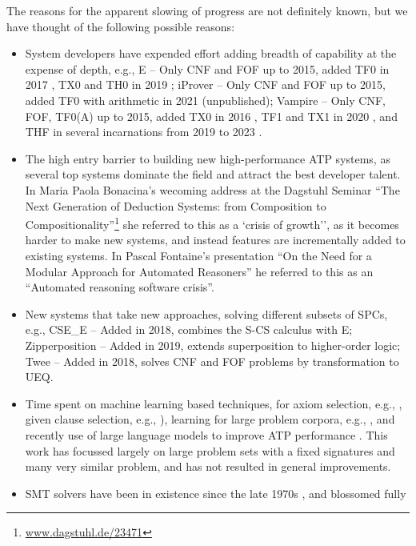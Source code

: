 \documentclass[runningheads]{llncs}
\begin{document}
The reasons for the apparent slowing of progress are not definitely known, but we have thought of 
the following possible reasons:
\begin{itemize}
\item System developers have expended effort adding breadth of capability at the expense of 
      depth, e.g., 
      E -- Only CNF and FOF up to 2015, added TF0 in 2017 \cite{SCV19}, TX0 and TH0 in 2019 
           \cite{VB+19};
      iProver -- Only CNF and FOF up to 2015, added TF0 with arithmetic in 2021 (unpublished);
      Vampire -- Only CNF, FOF, TF0(A) up to 2015, added TX0 in 2016 \cite{KK+16}, 
           TF1 and TX1 in 2020 \cite{BR20-IJCAR}, and THF in several incarnations from 2019 to 
           2023 \cite{BR19,Bha20-Thesis,BRS23}.
\item The high entry barrier to building new high-performance ATP systems, as several top systems
      dominate the field and attract the best developer talent.
      In Maria Paola Bonacina's wecoming address at the Dagstuhl Seminar ``The Next Generation 
      of Deduction Systems: from Composition to Compositionality''\footnote{%
      \href{https://www.dagstuhl.de/23471}{www.dagstuhl.de/23471}} she referred to this as a
     `crisis of growth'', as it becomes harder to make new systems, and instead features are 
      incrementally added to existing systems.
      In Pascal Fontaine's presentation ``On the Need for a Modular Approach for Automated 
      Reasoners'' he referred to this as an ``Automated reasoning software crisis''.
\item New systems that take new approaches, solving different subsets of SPCs, e.g.,
      CSE\_E \cite{XL+18} -- Added in 2018, combines the S-CS calculus with E;
      Zipperposition \cite{BB+21} -- Added in 2019, extends superposition to higher-order logic;
      Twee \cite{Sma21} -- Added in 2018, solves CNF and FOF problems by transformation to UEQ.
\item Time spent on machine learning based techniques, for 
      axiom selection, e.g., \cite{Urb06,KB14}, 
      given clause selection, e.g., \cite{JU17-CICM,CA+21,AA+22-ML,MS23}), 
      learning for large problem corpora, e.g., \cite{KM+14,JU19,BL+19-ICML}, 
      and recently use of large language models to improve ATP performance \cite{WX+23,AS+23}.
      This work has focussed largely on large problem sets with a fixed signatures and many
      very similar problem, and has not resulted in general improvements.
\item SMT solvers have been in existence since the late 1970s \cite{NO79}, and blossomed fully

\end{itemize}
\end{document}
